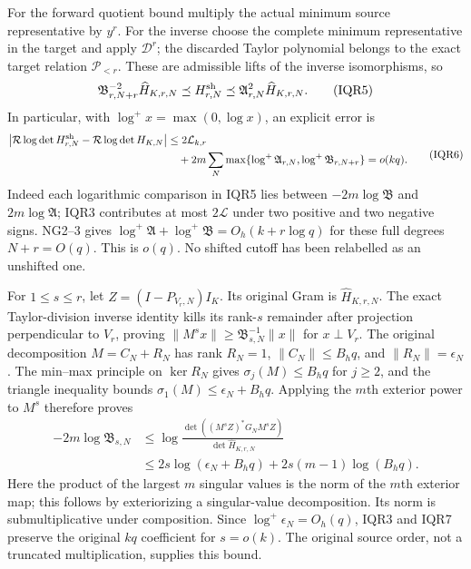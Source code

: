 \documentclass[11pt]{article}
\begin{document}
For the forward quotient bound multiply the actual minimum source
representative by $y^r$. For the inverse choose the complete minimum
representative in the target and apply $\mathscr D^r$; the discarded
Taylor polynomial belongs to the exact target relation $\mathcal P_{<r}$.
These are admissible lifts of the inverse isomorphisms, so
\[
\mathfrak B_{r,N+r}^{-2}\widehat H_{K,r,N}
\preceq H^{\rm sh}_{r,N}
\preceq\mathfrak A_{r,N}^2\widehat H_{K,r,N}.
\tag{IQR5}
\]
In particular, with $\log^+x=\max(0,\log x)$, an explicit error is
\[
\begin{split}
\left|\mathcal R\log\det H^{\rm sh}_{r,N}
      -\mathcal R\log\det H_{K,N}\right|
&\le2\mathcal L_{k,r}\\
&\quad+2m\sum_N
 \max\{\log^+\mathfrak A_{r,N},\log^+\mathfrak B_{r,N+r}\}
=o(kq).
\end{split}\tag{IQR6}
\]
Indeed each logarithmic comparison in IQR5 lies between
$-2m\log\mathfrak B$ and $2m\log\mathfrak A$;
IQR3 contributes at most $2\mathcal L$ under two positive and
two negative signs. NG2--3 gives
$\log^+\mathfrak A+\log^+\mathfrak B=O_h(k+r\log q)$
for these full degrees $N+r=O(q)$. This is $o(q)$.
No shifted cutoff has been relabelled as an unshifted one.

For $1\le s\le r$, let $Z=(I-P_{V_r,N})I_K$.
Its original Gram is $\widehat H_{K,r,N}$.
The exact Taylor-division inverse identity kills its rank-$s$
remainder after projection perpendicular to $V_r$, proving
$\|M^sx\|\ge\mathfrak B_{s,N}^{-1}\|x\|$ for $x\perp V_r$.
The original decomposition $M=C_N+R_N$ has rank $R_N=1$,
$\|C_N\|\le B_hq$, and $\|R_N\|=\epsilon_N$ \cite{Profile}.
The min--max principle on $\ker R_N$ gives
$\sigma_j(M)\le B_hq$ for $j\ge2$, and the triangle inequality
bounds $\sigma_1(M)\le\epsilon_N+B_hq$.
Applying the $m$th exterior power to $M^s$ therefore proves
\[
\begin{split}
-2m\log\mathfrak B_{s,N}
&\le \log\frac{\det((M^sZ)^*G_NM^sZ)}{\det\widehat H_{K,r,N}}\\
&\le2s\log(\epsilon_N+B_hq)+2s(m-1)\log(B_hq).
\end{split}\tag{IQR7}
\]
Here the product of the largest $m$ singular values is the norm of
the $m$th exterior map; this follows by exteriorizing a singular-value
decomposition. Its norm is submultiplicative under composition.
Since $\log^+\epsilon_N=O_h(q)$, IQR3 and IQR7 preserve the
original $kq$ coefficient for $s=o(k)$.
The original source order, not a truncated multiplication, supplies this bound.
\end{document}
